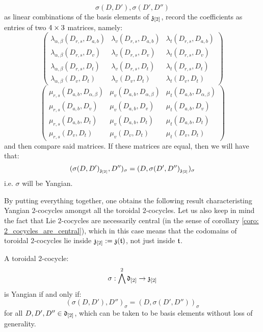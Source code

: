 \begin{remark}
                $$\sigma(D, D'), \sigma(D', D'')$$
            as linear combinations of the basis elements of $\mathfrak{z}_{[2]}$, record the coefficients as entries of two $4 \x 3$ matrices, namely:
                $$
                    \begin{pmatrix}
                        \lambda_{\alpha, \beta}(D_{r, s}, D_{a, b}) & \lambda_v(D_{r, s}, D_{a, b}) & \lambda_t(D_{r, s}, D_{a, b})
                        \\
                        \lambda_{\alpha, \beta}(D_{r, s}, D_v) & \lambda_v(D_{r, s}, D_v) & \lambda_t(D_{r, s}, D_v)
                        \\
                        \lambda_{\alpha, \beta}(D_{r, s}, D_t) & \lambda_v(D_{r, s}, D_t) & \lambda_t(D_{r, s}, D_t)
                        \\
                        \lambda_{\alpha, \beta}(D_v, D_t) & \lambda_v(D_v, D_t) & \lambda_t(D_v, D_t)
                    \end{pmatrix}
                $$
                $$
                    \begin{pmatrix}
                       \mu_{r, s}(D_{a, b}, D_{\alpha, \beta}) & \mu_v(D_{a, b}, D_{\alpha, \beta}) & \mu_t(D_{a, b}, D_{\alpha, \beta})
                        \\
                       \mu_{r, s}(D_{a, b}, D_v) & \mu_v(D_{a, b}, D_v) & \mu_t(D_{a, b}, D_v)
                        \\
                       \mu_{r, s}(D_{a, b}, D_t) & \mu_v(D_{a, b}, D_t) & \mu_t(D_{a, b}, D_t)
                        \\
                       \mu_{r, s}(D_v, D_t) & \mu_v(D_v, D_t) & \mu_t(D_v, D_t)
                    \end{pmatrix}
                $$
            and then compare said matrices. If these matrices are equal, then we will have that:
                $$(\sigma(D, D')_{\mathfrak{z}_{[2]}}, D'')_{\sigma} = (D, \sigma(D', D'')_{\mathfrak{z}_{[2]}})_{\sigma}$$
            i.e. $\sigma$ will be Yangian.
        \end{remark}
        By putting everything together, one obtains the following result characteristing Yangian $2$-cocycles amongst all the toroidal $2$-cocycles. Let us also keep in mind the fact that Lie $2$-cocycles are necessarily central (in the sense of corollary \ref{coro: 2_cocycles_are_central}), which in this case means that the codomains of toroidal $2$-cocycles lie inside $\mathfrak{z}_{[2]} := \mathfrak{z}(\mathfrak{t})$, not just inside $\mathfrak{t}$.
        \begin{theorem} \label{theorem: yangian_criterion_for_toroidal_cocycles}
            A toroidal $2$-cocycle:
                $$\sigma: \bigwedge^2 \mathfrak{d}_{[2]} \to \mathfrak{z}_{[2]}$$
            is Yangian if and only if:
                $$(\sigma(D, D'), D'')_{\sigma} = (D, \sigma(D', D''))_{\sigma}$$
            for all $D, D', D'' \in \mathfrak{d}_{[2]}$, which can be taken to be basis elements without loss of generality. 
        \end{theorem}

